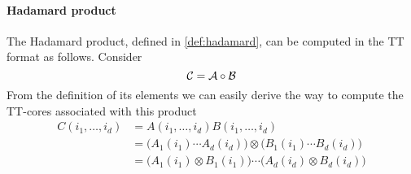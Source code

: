 \paragraph{Hadamard product} The Hadamard product, defined in \ref{def:hadamard}, can be computed in the TT format as follows. Consider
\begin{equation*}
  \mathcal{C} = \mathcal{A} \circ \mathcal{B}
\end{equation*}
From the definition of its elements we can easily derive the way to compute the TT-cores associated with this product
\begin{equation*}
  \begin{split}
    C(i_1,\ldots,i_d) &= A(i_1,\ldots,i_d) B(i_1,\ldots,i_d)\\
    &= \Big( A_1(i_1) \cdots A_d(i_d) \Big) \otimes \Big( B_1(i_1) \cdots B_d(i_d) \Big) \\
    &= \Big( A_1(i_1) \otimes B_1(i_1) \Big) \cdots \Big( A_d(i_d) \otimes B_d(i_d) \Big)
  \end{split}
\end{equation*}

